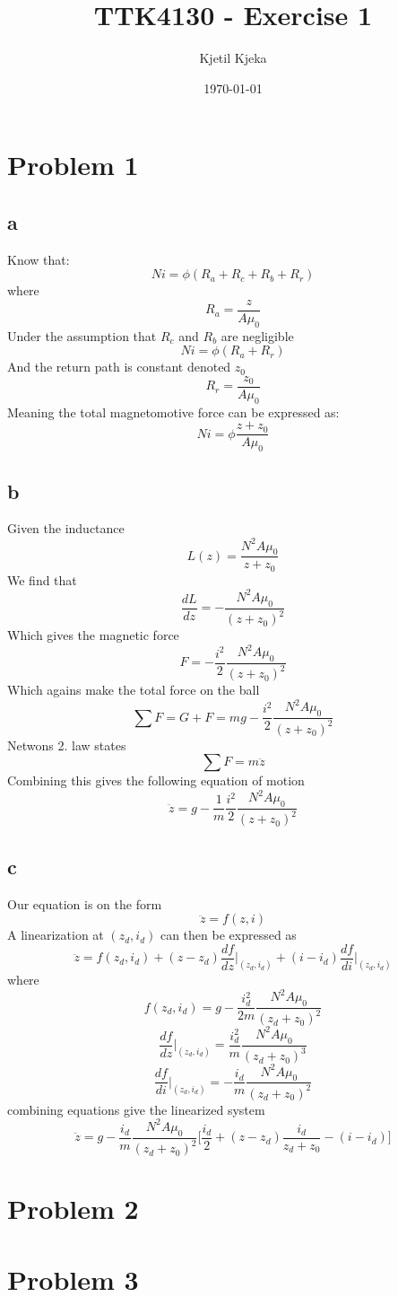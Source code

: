 \documentclass[11pt]{article}
\author{Kjetil Kjeka}
\title{TTK4130 - Exercise 1}
\date{\today}
\begin{document}
\maketitle
\section*{Problem 1}
\subsection*{a}
Know that:
\[Ni = \phi (R_a + R_c + R_b + R_r) \]
where
\[R_a = \frac{z}{A \mu_0} \]
Under the assumption that $R_c$ and $R_b$ are negligible
\[Ni = \phi (R_a + R_r) \]
And the return path is constant denoted $z_0$
\[R_r = \frac{z_0}{A \mu_0}\]
Meaning the total magnetomotive force can be expressed as:
\[Ni = \phi \frac{z + z_0}{A \mu_0} \]

\subsection*{b}
Given the inductance
\[ L(z) = \frac{N^2 A \mu_0}{z + z_0}\]
We find that
\[ \frac{dL}{dz} = - \frac{N^2 A \mu_0}{(z + z_0)^2} \]
Which gives the magnetic force
\[ F = - \frac{i^2}{2} \frac{N^2 A \mu_0}{(z + z_0)^2} \]
Which agains make the total force on the ball
\[ \sum F = G + F = mg - \frac{i^2}{2} \frac{N^2 A \mu_0}{(z + z_0)^2} \]
Netwons 2. law states
\[ \sum F = m \ddot{z} \]
Combining this gives the following equation of motion
\[\ddot{z} = g - \frac{1}{m} \frac{i^2}{2} \frac{N^2 A \mu_0}{(z + z_0)^2} \]

\subsection*{c}
Our equation is on the form
\[\ddot{z} = f(z, i) \]
A linearization at $(z_d, i_d)$ can then be expressed as
\[\ddot{z} = f(z_d, i_d) + (z - z_d) \frac{df}{dz}\bigg|_{(z_d, i_d)} + (i - i_d) \frac{df}{di}\bigg|_{(z_d, i_d)} \]
where
\[f(z_d, i_d) = g - \frac{i_d^2}{2m} \frac{N^2 A \mu_0}{(z_d + z_0)^2} \]
\[\frac{df}{dz}\bigg|_{(z_d, i_d)} = \frac{i_d^2}{m} \frac{N^2 A \mu_0}{(z_d + z_0)^3} \]
\[\frac{df}{di}\bigg|_{(z_d, i_d)} = -\frac{i_d}{m} \frac{N^2 A \mu_0}{(z_d + z_0)^2} \]
combining equations give the linearized system
\[\ddot{z} = g - \frac{i_d}{m} \frac{N^2 A \mu_0}{(z_d + z_0)^2} \bigg[ \frac{i_d}{2} + (z-z_d)\frac{i_d}{z_d + z_0} - (i - i_d) \bigg] \]


\section*{Problem 2}

\section*{Problem 3}
\end{document}
